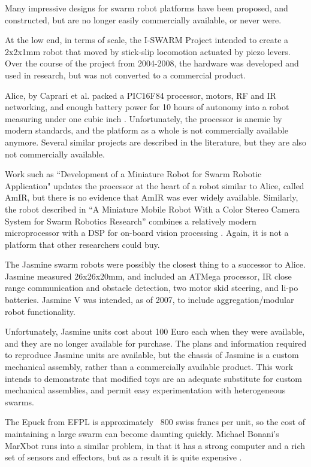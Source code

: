\documentclass[]{article}
\begin{document}
Many impressive designs for swarm robot platforms have been proposed, and constructed, but are no longer easily commercially available, or never were. 

At the low end, in terms of scale, the I-SWARM Project intended to create a 2x2x1mm robot that moved by stick-slip locomotion actuated by piezo levers\cite{seyfried2005swarm}. 
Over the course of the project from 2004-2008, the hardware was developed and used in research, but was not converted to a commercial product. 

Alice, by Caprari et al. packed a PIC16F84 processor, motors, RF and IR networking, and enough battery power for 10 hours of autonomy into a robot measuring under one cubic inch \cite{caprari1998autonomous}. 
Unfortunately, the processor is anemic by modern standards, and the platform as a whole is not commercially available anymore. 
Several similar projects are described in the literature, but they are also not commercially available. 

Work such as ``Development of a Miniature Robot for Swarm Robotic Application" updates the processor at the heart of a robot similar to Alice, called AmIR, but there is no evidence that AmIR was ever widely available\cite{arvin2009development}.
Similarly, the robot described in ``A Miniature Mobile Robot With a Color Stereo Camera System for Swarm Robotics Research'' combines a relatively modern microprocessor with a DSP for on-board vision processing \cite{haverinen2005miniature}. 
Again, it is not a platform that other researchers could buy.

The Jasmine swarm robots were possibly the closest thing to a successor to Alice.
Jasmine measured 26x26x20mm, and included an ATMega processor, IR close range communication and obstacle detection, two motor skid steering, and li-po batteries.
Jasmine V was intended, as of 2007, to include aggregation/modular robot functionality.  

Unfortunately, Jasmine units cost about 100 Euro each when they were available, and they are no longer available for purchase. 
The plans and information required to reproduce Jasmine units are available, but the chassis of Jasmine is a custom mechanical assembly, rather than a commercially available product. 
This work intends to demonstrate that modified toys are an adequate substitute for custom mechanical assemblies, and permit easy experimentation with heterogeneous swarms. 

The Epuck from EFPL is approximately ~800 swiss francs per unit, so the cost of maintaining a large swarm can become daunting quickly. Michael Bonani's MarXbot runs into a similar problem, in that it has a strong computer and a rich set of sensors and effectors, but as a result it is quite expensive \cite{bonani2010marxbot}. 
\end{document}
